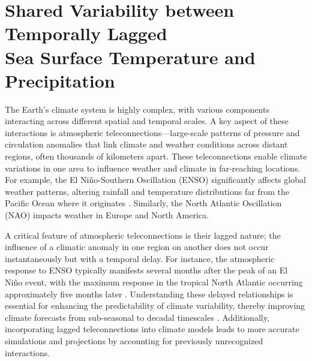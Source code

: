
\ifpdf
    \graphicspath{{content/chapter6/figs/raster/}{content/chapter6/figs/pdf/}{content/chapter6/figs/}}
\else
    \graphicspath{{content/chapter6/figs/vector/}{content/chapter6/figs/}}
\fi






\chapter[Shared Variability between Temporally Lagged Sea Surface Temperature and Precipitation]{Shared Variability between Temporally Lagged\\Sea Surface Temperature and Precipitation}\label{chapter:tele}

The Earth's climate system is highly complex, with various components interacting across different spatial and temporal scales. A key aspect of these interactions is atmospheric teleconnections---large-scale patterns of pressure and circulation anomalies that link climate and weather conditions across distant regions, often thousands of kilometers apart. These teleconnections enable climate variations in one area to influence weather and climate in far-reaching locations. For example, the El Niño-Southern Oscillation (ENSO) significantly affects global weather patterns, altering rainfall and temperature distributions far from the Pacific Ocean where it originates \cite{rodriguez-fonseca_review_2016,scaife_enso_2024}. Similarly, the North Atlantic Oscillation (NAO) impacts weather in Europe and North America.

A critical feature of atmospheric teleconnections is their lagged nature; the influence of a climatic anomaly in one region on another does not occur instantaneously but with a temporal delay. For instance, the atmospheric response to ENSO typically manifests several months after the peak of an El Niño event, with the maximum response in the tropical North Atlantic occurring approximately five months later \cite{enfield_tropical_1997,klein_remote_1999,saravanan_interaction_2000}. Understanding these delayed relationships is essential for enhancing the predictability of climate variability, thereby improving climate forecasts from sub-seasonal to decadal timescales \cite{stan_review_2017,yuan_interconnected_2018}. Additionally, incorporating lagged teleconnections into climate models leads to more accurate simulations and projections by accounting for previously unrecognized interactions.

